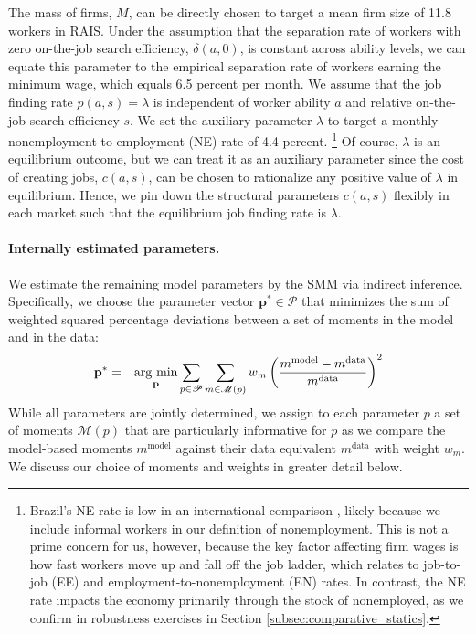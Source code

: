 The mass of firms, $M$, can be directly chosen to target a mean firm size of 11.8 workers in RAIS. Under the assumption that the separation rate of workers with zero on-the-job search efficiency, $\delta(a,0)$, is constant across ability levels, we can equate this parameter to the empirical separation rate of workers earning the minimum wage, which equals 6.5 percent per month. We assume that the job finding rate $p(a,s)=\lambda$ is independent of worker ability $a$ and relative on-the-job search efficiency $s$. We set the auxiliary parameter $\lambda$ to target a monthly nonemployment-to-employment (NE) rate of 4.4 percent.%
%
\footnote{Brazil's NE rate is low in an international comparison \citep{engbom2021}, likely because we include informal workers in our definition of nonemployment. This is not a prime concern for us, however, because the key factor affecting firm wages is how fast workers move up and fall off the job ladder, which relates to job-to-job (EE) and employment-to-nonemployment (EN) rates. In contrast, the NE rate impacts the economy primarily through the stock of nonemployed, as we confirm in robustness exercises in Section \ref{subsec:comparative_statics}.} %
%
Of course, $\lambda$ is an equilibrium outcome, but we can treat it as an auxiliary parameter since the cost of creating jobs, $c(a,s)$, can be chosen to rationalize any positive value of $\lambda$ in equilibrium. Hence, we pin down the structural parameters $c(a,s)$ flexibly in each market such that the equilibrium job finding rate is $\lambda$.


\paragraph{Internally estimated parameters.}

We estimate the remaining model parameters by the SMM via indirect inference. Specifically, we choose the parameter vector $\mathbf{p}^{\ast} \in \mathscr{P}$ that minimizes the sum of weighted squared percentage deviations between a set of moments in the model and in the data:
%
\begin{eqnarray*}
  \mathbf{p}^{\ast} &=& \operatorname{arg \ min}\displaylimits_{\mathbf{p}} \sum_{p\in\mathscr{P}} \sum_{m\in \mathscr{M}(p)} w_m \left(\frac{m^{\text{model}} - m^{\text{data}}}{m^{\text{data}}}\right)^2
\end{eqnarray*}
%
While all parameters are jointly determined, we assign to each parameter $p$ a set of moments $\mathscr{M}(p)$ that are particularly informative for $p$ as we compare the model-based moments $m^{\text{model}}$ against their data equivalent $m^{\text{data}}$ with weight $w_{m}$. We discuss our choice of moments and weights in greater detail below.

